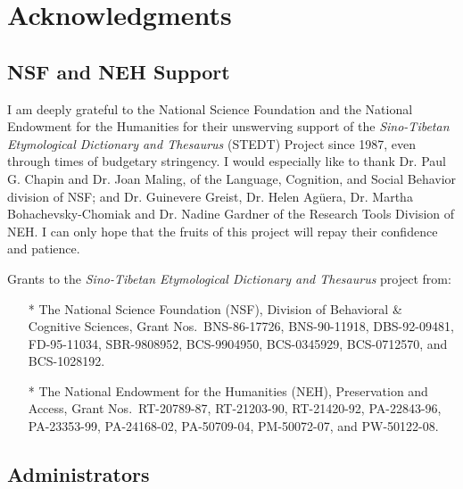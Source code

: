 \vspace{0.25em}

\chapter*{Acknowledgments}

\renewcommand{\thefootnote}{\arabic{footnote}}
\setcounter{footnote}{0}

\section{NSF and NEH Support}

I am deeply grateful to the National Science Foundation and the National Endowment for the Humanities for their unswerving support of the {\it Sino-Tibetan Etymological Dictionary and Thesaurus} (STEDT) Project since 1987, even through times of budgetary stringency. I would especially like to thank Dr. Paul G. Chapin and Dr. Joan Maling, of the Language, Cognition, and Social Behavior division of NSF; and Dr. Guinevere Greist, Dr. Helen Ag\"uera, Dr. Martha Bohachevsky-Chomiak and Dr. Nadine Gardner of the Research Tools Division of NEH. I can only hope that the fruits of this project will repay their confidence and patience.

Grants to the \textit{Sino-Tibetan Etymological Dictionary and Thesaurus} project from:

\begin{itemize}
\item[*] The National Science Foundation (NSF), Division of
  Behavioral \& Cognitive Sciences, Grant Nos.\ BNS-86-17726,
  BNS-90-11918, DBS-92-09481, FD-95-11034, SBR-9808952,
  BCS-9904950, BCS-0345929,  BCS-0712570, and BCS-1028192.
\item[*] The National Endowment for the Humanities (NEH),
  Preservation and Access, Grant Nos.\ RT-20789-87, RT-21203-90,
  RT-21420-92, PA-22843-96, PA-23353-99, PA-24168-02,
  PA-50709-04,  PM-50072-07, and PW-50122-08.
\end{itemize}

\section{Administrators}

